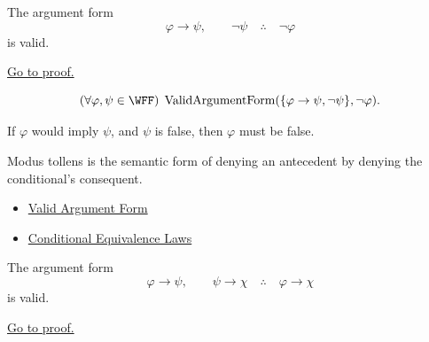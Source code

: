 \begin{tcolorbox}[colback=thmbox, colframe=thmborder, arc=2pt,
  left=6pt, right=6pt, top=4pt, bottom=4pt,
  title={\small\textbf{Theorem (Modus Tollens is Valid)}},
  fonttitle=\small\bfseries]
\begin{theorem}
\label{thm:modus-tollens-validity-propositional-logic}
The argument form
\[
\varphi\to\psi,\qquad \neg\psi \quad\therefore\quad \neg\varphi
\]
is valid.

\noindent\hyperref[prf:modus-tollens-validity-propositional-logic]{Go to proof.}
\end{theorem}
\end{tcolorbox}

\begin{remark*}
\[
(\forall\varphi,\psi\in\WFF)\;\operatorname{ValidArgumentForm}(\{\varphi\to\psi,\neg\psi\},\neg\varphi).
\]
\end{remark*}

\begin{remark*}
If \(\varphi\) would imply \(\psi\), and \(\psi\) is false, then \(\varphi\) must be false.
\end{remark*}

\begin{remark*}[Interpretation]
Modus tollens is the semantic form of denying an antecedent by denying the
conditional's consequent.
\end{remark*}

\begin{dependencies}
\begin{itemize}
  \item \hyperref[def:valid-argument-form-propositional-logic]{Valid Argument Form}
  \item \hyperref[thm:conditional-equivalence-laws-propositional-logic]{Conditional Equivalence Laws}
\end{itemize}
\end{dependencies}

\begin{tcolorbox}[colback=thmbox, colframe=thmborder, arc=2pt,
  left=6pt, right=6pt, top=4pt, bottom=4pt,
  title={\small\textbf{Theorem (Hypothetical Syllogism is Valid)}},
  fonttitle=\small\bfseries]
\begin{theorem}
\label{thm:hypothetical-syllogism-validity-propositional-logic}
The argument form
\[
\varphi\to\psi,\qquad \psi\to\chi \quad\therefore\quad \varphi\to\chi
\]
is valid.

\noindent\hyperref[prf:hypothetical-syllogism-validity-propositional-logic]{Go to proof.}
\end{theorem}
\end{tcolorbox}

